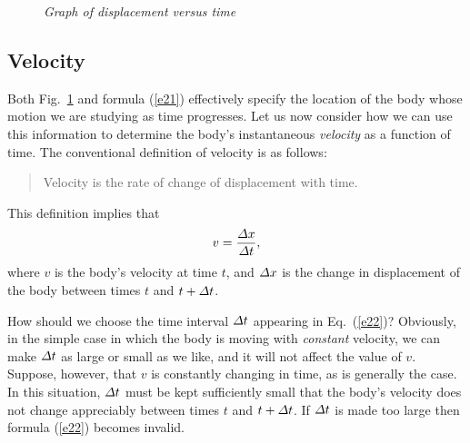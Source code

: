 \begin{figure}[t]
\epsfysize=3in
\centerline{}
\caption{\em Graph of displacement versus time}\label{f3}   
\end{figure}

\subsection{Velocity}
Both Fig.~\ref{f3} and formula (\ref{e21}) effectively specify the location
of the body whose motion we are studying as time progresses.
Let us now consider how we can use this information to determine the body's
instantaneous {\em velocity} as a function of time. The conventional
definition of velocity is as follows:
\begin{quote}
{\sf Velocity is the rate of change of displacement with time.}
\end{quote}
This definition implies that
\begin{equation}\label{e22}
v = \frac{{\mit\Delta}x}{{\mit\Delta} t},
\end{equation}
where $v$ is the body's velocity at time $t$, and ${\mit\Delta} x$ is the change in displacement
of the body between times $t$ and $t+{\mit\Delta} t$. 

How should we choose the
time interval ${\mit\Delta} t$ appearing in Eq.~(\ref{e22})?
Obviously,  in the simple case in which the
body is moving with {\em constant} velocity,  we can make ${\mit\Delta} t$ as
large or small as we like, and it will not affect the value of $v$. Suppose, however,
that $v$ is constantly changing in time, as is generally the case. 
In this situation, ${\mit\Delta} t$ must be kept sufficiently small that the body's velocity
does not change appreciably between times $t$ and $t+{\mit\Delta} t$. If
${\mit\Delta} t$ is made too large then formula (\ref{e22}) becomes invalid. 

